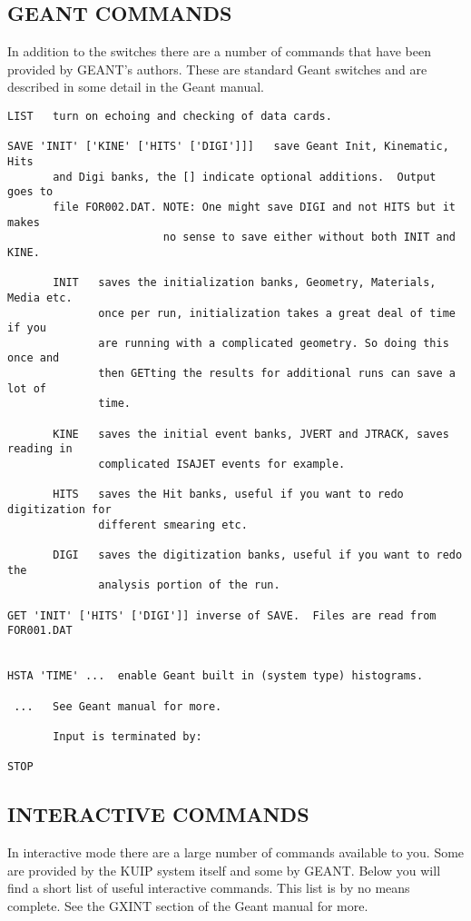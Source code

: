 \subsection{GEANT COMMANDS}

In addition to the switches there are a number of commands that have been
provided by GEANT's authors. These are standard Geant switches and are
described in some detail in the Geant manual.

\begin{verbatim}
LIST   turn on echoing and checking of data cards.

SAVE 'INIT' ['KINE' ['HITS' ['DIGI']]]   save Geant Init, Kinematic, Hits
       and Digi banks, the [] indicate optional additions.  Output goes to
       file FOR002.DAT. NOTE: One might save DIGI and not HITS but it makes
                        no sense to save either without both INIT and KINE.

       INIT   saves the initialization banks, Geometry, Materials, Media etc.
              once per run, initialization takes a great deal of time if you
              are running with a complicated geometry. So doing this once and
              then GETting the results for additional runs can save a lot of
              time.

       KINE   saves the initial event banks, JVERT and JTRACK, saves reading in
              complicated ISAJET events for example.

       HITS   saves the Hit banks, useful if you want to redo digitization for
              different smearing etc.

       DIGI   saves the digitization banks, useful if you want to redo the
              analysis portion of the run.

GET 'INIT' ['HITS' ['DIGI']] inverse of SAVE.  Files are read from FOR001.DAT


HSTA 'TIME' ...  enable Geant built in (system type) histograms.

 ...   See Geant manual for more.

       Input is terminated by:

STOP
\end{verbatim}

\subsection{INTERACTIVE COMMANDS}

In interactive mode there are a large number of commands available to you. Some
are provided by the KUIP system itself and some by GEANT.
Below you will find a short list of useful interactive
commands. This list is by no means complete.  See the GXINT section of the
Geant manual for more.

